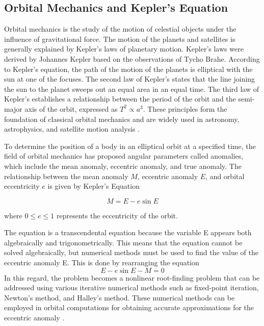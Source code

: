 \documentclass[a4paper,11pt]{article}
\begin{document}
\subsection{Orbital Mechanics and Kepler's Equation}

Orbital mechanics is the study of the motion of celestial objects under the influence of gravitational force. The motion of the planets and satellites is generally explained by Kepler's laws of planetary motion. Kepler's laws were derived by Johannes Kepler based on the observations of Tycho Brahe. According to Kepler's equation, the path of the motion of the planets is elliptical with the sun at one of the focuses. The second law of Kepler's states that the line joining the sun to the planet sweeps out an equal area in an equal time. The third law of Kepler's establishes a relationship between the period of the orbit and the semi-major axis of the orbit, expressed as $T^2 \propto a^3$. These principles form the foundation of classical orbital mechanics and are widely used in astronomy, astrophysics, and satellite motion analysis \parencite{salah2025kepler}.

To determine the position of a body in an elliptical orbit at a specified time, the field of orbital mechanics has proposed angular parameters called anomalies, which include the mean anomaly, eccentric anomaly, and true anomaly. The relationship between the mean anomaly $M$, eccentric anomaly $E$, and orbital eccentricity $e$ is given by Kepler's Equation

\begin{equation*}
M = E - e \sin E
\end{equation*}

\noindent where $0 \leq e \le 1$ represents the eccentricity of the orbit.

The equation is a transcendental equation because the variable E appears both algebraically and trigonometrically. This means that the equation cannot be solved algebraically, but numerical methods must be used to find the value of the eccentric anomaly E. This is done by rearranging the equation
\begin{equation*}
    E - e \sin E - M = 0
\end{equation*}
In this regard, the problem becomes a nonlinear root-finding problem that can be addressed using various iterative numerical methods such as fixed-point iteration, Newton's method, and Halley's method. These numerical methods can be employed in orbital computations for obtaining accurate approximations for the eccentric anomaly \parencite{salah2025kepler}.
 
\end{document}

